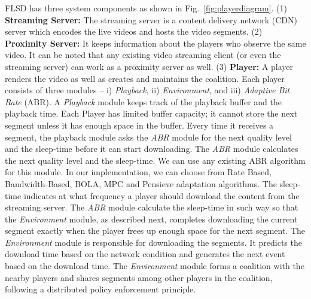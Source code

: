 FLSD has three system components as shown in Fig.~\ref{fig:playerdiagram}. (1) {\bf Streaming Server:} The streaming server is a content delivery network (CDN) server which encodes the live videos and hosts the video segments.
(2) {\bf Proximity Server:} It keeps information about the players who observe the same video.
It can be noted that any existing video streaming client (or even the streaming server) can work as a proximity server as well. 
(3) {\bf Player:} A player renders the video as well as creates and maintains the coalition. Each player consists of three modules -- i) \textit{Playback}, ii) \textit{Environment}, and iii) \textit{Adaptive Bit Rate} (ABR). 
% 
A {\it Playback} module keeps track of the playback buffer and the playback time. Each Player has limited buffer capacity; it cannot store the next segment unless it has enough space in the buffer. Every time it receives a segment, the playback module asks the {\it ABR} module for the next quality level and the sleep-time before it can start downloading.
The {\it ABR} module calculates the next quality level and the sleep-time. We can use any existing ABR algorithm for this module. In our implementation, we can choose from Rate Based, Bandwidth-Based, BOLA, MPC and Pensieve adaptation algorithms. The sleep-time indicates at what frequency a player should download the content from the streaming server.  The {\it ABR} module calculate the sleep-time in such way so that the {\it Environment} module, as described next, completes downloading the current segment exactly when the player frees up enough space for the next segment. The {\it Environment} module is responsible for downloading the segments. It predicts the download time based on the network condition and generates the next event based on the download time.
The {\it Environment} module forms a coalition with the nearby players and shares segments among other players in the coalition, following a distributed policy enforcement principle. 
